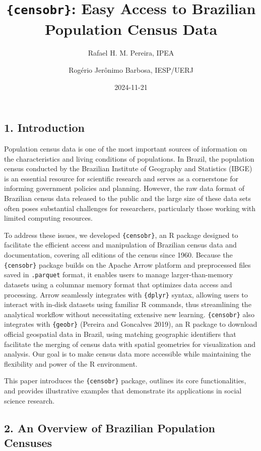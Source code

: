 \documentclass[
]{article}
\title{\texttt{\{censobr\}}: Easy Access to Brazilian Population Census
Data}
\author{Rafael H. M. Pereira, IPEA \and Rogério Jerônimo Barbosa,
IESP/UERJ}
\date{2024-11-21}
\begin{document}
\maketitle

\subsection{1. Introduction}\label{introduction}

Population census data is one of the most important sources of
information on the characteristics and living conditions of populations.
In Brazil, the population census conducted by the Brazilian Institute of
Geography and Statistics (IBGE) is an essential resource for scientific
research and serves as a cornerstone for informing government policies
and planning. However, the raw data format of Brazilian census data
released to the public and the large size of these data sets often poses
substantial challenges for researchers, particularly those working with
limited computing resources.

To address these issues, we developed \texttt{\{censobr\}}, an R package
designed to facilitate the efficient access and manipulation of
Brazilian census data and documentation, covering all editions of the
census since 1960. Because the \texttt{\{censobr\}} package builds on
the Apache Arrow platform and preprocessed files saved in
\texttt{.parquet} format, it enables users to manage larger-than-memory
datasets using a columnar memory format that optimizes data access and
processing. Arrow seamlessly integrates with \texttt{\{dplyr\}} syntax,
allowing users to interact with in-disk datasets using familiar R
commands, thus streamlining the analytical workflow without
necessitating extensive new learning. \texttt{\{censobr\}} also
integrates with \texttt{\{geobr\}} (Pereira and Goncalves 2019), an R
package to download official geospatial data in Brazil, using matching
geographic identifiers that facilitate the merging of census data with
spatial geometries for visualization and analysis. Our goal is to make
census data more accessible while maintaining the flexibility and power
of the R environment.

This paper introduces the \texttt{\{censobr\}} package, outlines its
core functionalities, and provides illustrative examples that
demonstrate its applications in social science research.

\subsection{2. An Overview of Brazilian Population
Censuses}\label{an-overview-of-brazilian-population-censuses}
\end{document}
